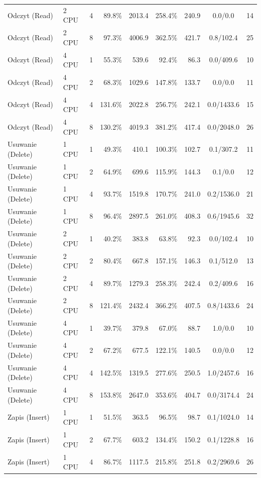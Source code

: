 \begin{table}[ht]
{\begin{tabular}{llcrrrrcc}
Odczyt (Read) & 2 CPU & 4 & 89.8\% & 2013.4 & 258.4\% & 240.9 & 0.0/0.0 & 14 \\
Odczyt (Read) & 2 CPU & 8 & 97.3\% & 4006.9 & 362.5\% & 421.7 & 0.8/102.4 & 25 \\
Odczyt (Read) & 4 CPU & 1 & 55.3\% & 539.6 & 92.4\% & 86.3 & 0.0/409.6 & 10 \\
Odczyt (Read) & 4 CPU & 2 & 68.3\% & 1029.6 & 147.8\% & 133.7 & 0.0/0.0 & 11 \\
Odczyt (Read) & 4 CPU & 4 & 131.6\% & 2022.8 & 256.7\% & 242.1 & 0.0/1433.6 & 15 \\
Odczyt (Read) & 4 CPU & 8 & 130.2\% & 4019.3 & 381.2\% & 417.4 & 0.0/2048.0 & 26 \\
Usuwanie (Delete) & 1 CPU & 1 & 49.3\% & 410.1 & 100.3\% & 102.7 & 0.1/307.2 & 11 \\
Usuwanie (Delete) & 1 CPU & 2 & 64.9\% & 699.6 & 115.9\% & 144.3 & 0.1/0.0 & 12 \\
Usuwanie (Delete) & 1 CPU & 4 & 93.7\% & 1519.8 & 170.7\% & 241.0 & 0.2/1536.0 & 21 \\
Usuwanie (Delete) & 1 CPU & 8 & 96.4\% & 2897.5 & 261.0\% & 408.3 & 0.6/1945.6 & 32 \\
Usuwanie (Delete) & 2 CPU & 1 & 40.2\% & 383.8 & 63.8\% & 92.3 & 0.0/102.4 & 10 \\
Usuwanie (Delete) & 2 CPU & 2 & 80.4\% & 667.8 & 157.1\% & 146.3 & 0.1/512.0 & 13 \\
Usuwanie (Delete) & 2 CPU & 4 & 89.7\% & 1279.3 & 258.3\% & 242.4 & 0.2/409.6 & 16 \\
Usuwanie (Delete) & 2 CPU & 8 & 121.4\% & 2432.4 & 366.2\% & 407.5 & 0.8/1433.6 & 24 \\
Usuwanie (Delete) & 4 CPU & 1 & 39.7\% & 379.8 & 67.0\% & 88.7 & 1.0/0.0 & 10 \\
Usuwanie (Delete) & 4 CPU & 2 & 67.2\% & 677.5 & 122.1\% & 140.5 & 0.0/0.0 & 12 \\
Usuwanie (Delete) & 4 CPU & 4 & 142.5\% & 1319.5 & 277.6\% & 250.5 & 1.0/2457.6 & 16 \\
Usuwanie (Delete) & 4 CPU & 8 & 153.8\% & 2647.0 & 353.6\% & 404.7 & 0.0/3174.4 & 24 \\
Zapis (Insert) & 1 CPU & 1 & 51.5\% & 363.5 & 96.5\% & 98.7 & 0.1/1024.0 & 14 \\
Zapis (Insert) & 1 CPU & 2 & 67.7\% & 603.2 & 134.4\% & 150.2 & 0.1/1228.8 & 16 \\
Zapis (Insert) & 1 CPU & 4 & 86.7\% & 1117.5 & 215.8\% & 251.8 & 0.2/2969.6 & 26 \\

\end{tabular}}
\end{table}

